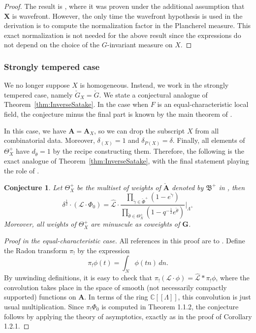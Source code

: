 \documentclass{amsart}
\newtheorem{conj}[theorem]{Conjecture}
\theoremstyle{definition}
\theoremstyle{remark}
\newcommand{\1}{\mathbf{1}}
\newcommand{\C}{\mathbb{C}}
\newcommand{\mb}[1]{\mathbf{#1}}
\newcommand{\sh}[1]{\mathcal{#1}}
\theoremstyle{definition}
\begin{document}
\begin{proof}
    The result is \cite[Theorem 7.7]{SakInvSatake}, where it was proven under the additional assumption that $\mb{X}$ is wavefront. However, the only time the wavefront hypothesis is used in the derivation is to compute the normalization factor in the Plancherel measure. This exact normalization is not needed for the above result since the expressions do not depend on the choice of the $G$-invariant measure on $X$.
\end{proof}

\subsubsection{Strongly tempered case}
We no longer suppose $X$ is homogeneous. Instead, we work in the strongly tempered case, namely $\check{G}_X=\check{G}$. We state a conjectural analogue of Theorem~\ref{thm:InverseSatake}. In the case when $F$ is an equal-characteristic local field, the conjecture minus the final part is known by the main theorem of \cite{SakWang}.

In this case, we have $\mb{A}=\mb{A}_X$, so we can drop the subscript $X$ from all combinatorial data. Moreover, $\delta_{(X)}=1$ and $\delta_{P(X)}=\delta$. Finally, all elements of $\Theta_X^+$ have $d_{\check{\theta}}=1$ by the recipe constructing them. Therefore, the following is the exact analogue of Theorem~\ref{thm:InverseSatake}, with the final statement playing the role of \cite[Statement 7.1.5]{SakSpherical}.

\begin{conj}\label{conj:InverseSatake}
    Let $\Theta_X^+$ be the multiset of weights of $\check{\mb{A}}$ denoted by $\mathfrak{B}^+$ in \cite[Theorem 1.1.2]{SakWang}, then
    \[
        \delta^{\frac{1}{2}}\cdot(\sh{L}\cdot\Phi_0)=\hat{\sh{L}}\cdot\frac{\prod_{\check{\gamma}\in\check{\Phi}^+}(1-e^{\check{\gamma}})}{\prod_{\check{\theta}\in\Theta_X^+}(1-q^{-\frac{1}{2}}e^{\check{\theta}})}\bigg|_{\Lambda^+}
    \]
    Moreover, all weights of $\Theta_X^+$ are minuscule as coweights of $\mb{G}$.
\end{conj}
\begin{proof}[Proof in the equal-characteristic case]
    All references in this proof are to \cite{SakWang}. Define the Radon transform $\pi_!$ by the expression
    \[
        \pi_!\phi(t)=\int_{N}\phi(tn)\,dn.
    \]
    By unwinding definitions, it is easy to check that $\pi_!(\sh{L}\cdot\phi)=\hat{\sh{L}}\ast\pi_!\phi$, where the convolution takes place in the space of smooth (not necessarily compactly supported) functions on $\mb{A}$. In terms of the ring $\C[[\Lambda]]$, this convolution is just usual multiplication. Since $\pi_!\Phi_0$ is computed in Theorem 1.1.2, the conjecture follows by applying the theory of asymptotics, exactly as in the proof of Corollary 1.2.1.
\end{proof}
\end{document}
